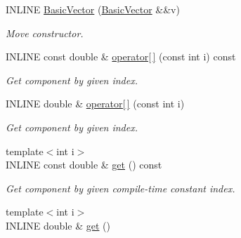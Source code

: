 \begin{DoxyCompactItemize}
\hypertarget{classBasicVector_3_01double_01_4_a452d8ac00f2c7176d13512bbac155c57}{}\label{classBasicVector_3_01double_01_4_a452d8ac00f2c7176d13512bbac155c57} 
I\+N\+L\+I\+NE \hyperlink{classBasicVector_3_01double_01_4_a452d8ac00f2c7176d13512bbac155c57}{Basic\+Vector} (\hyperlink{classBasicVector}{Basic\+Vector} \&\&v)
\begin{DoxyCompactList}\small\item\em Move constructor. \end{DoxyCompactList}\item 
\hypertarget{classBasicVector_3_01double_01_4_a80108c25a1f3a10f964e75e6e3105f0d}{}\label{classBasicVector_3_01double_01_4_a80108c25a1f3a10f964e75e6e3105f0d} 
I\+N\+L\+I\+NE const double \& \hyperlink{classBasicVector_3_01double_01_4_a80108c25a1f3a10f964e75e6e3105f0d}{operator\mbox{[}$\,$\mbox{]}} (const int i) const
\begin{DoxyCompactList}\small\item\em Get component by given index. \end{DoxyCompactList}\item 
\hypertarget{classBasicVector_3_01double_01_4_af046e4e752d917e083d77dbd66bf6f93}{}\label{classBasicVector_3_01double_01_4_af046e4e752d917e083d77dbd66bf6f93} 
I\+N\+L\+I\+NE double \& \hyperlink{classBasicVector_3_01double_01_4_af046e4e752d917e083d77dbd66bf6f93}{operator\mbox{[}$\,$\mbox{]}} (const int i)
\begin{DoxyCompactList}\small\item\em Get component by given index. \end{DoxyCompactList}\item 
\hypertarget{classBasicVector_3_01double_01_4_aa3e0eb8159a00bef3fd587e212bf8fb1}{}\label{classBasicVector_3_01double_01_4_aa3e0eb8159a00bef3fd587e212bf8fb1} 
{\footnotesize template$<$int i$>$ }\\I\+N\+L\+I\+NE const double \& \hyperlink{classBasicVector_3_01double_01_4_aa3e0eb8159a00bef3fd587e212bf8fb1}{get} () const
\begin{DoxyCompactList}\small\item\em Get component by given compile-\/time constant index. \end{DoxyCompactList}\item 
\hypertarget{classBasicVector_3_01double_01_4_a6b1022e55f898c344599ae494f61d733}{}\label{classBasicVector_3_01double_01_4_a6b1022e55f898c344599ae494f61d733} 
{\footnotesize template$<$int i$>$ }\\I\+N\+L\+I\+NE double \& \hyperlink{classBasicVector_3_01double_01_4_a6b1022e55f898c344599ae494f61d733}{get} ()

\end{DoxyCompactItemize}

